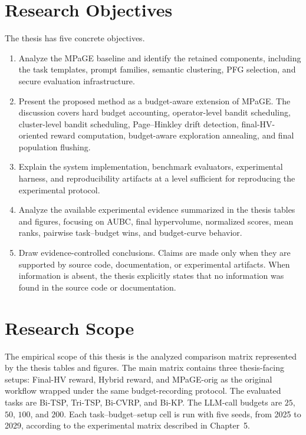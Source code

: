 \documentclass[../main.tex]{subfiles}
\begin{document}
\section{Research Objectives}

The thesis has five concrete objectives.

\begin{enumerate}
  \item Analyze the MPaGE baseline and identify the retained components, including the task templates, prompt families, semantic clustering, PFG selection, and secure evaluation infrastructure.
  \item Present the proposed \bmab{} method as a budget-aware extension of MPaGE. The discussion covers hard budget accounting, operator-level bandit scheduling, cluster-level bandit scheduling, Page--Hinkley drift detection, final-HV-oriented reward computation, budget-aware exploration annealing, and final population flushing.
  \item Explain the system implementation, benchmark evaluators, experimental harness, and reproducibility artifacts at a level sufficient for reproducing the experimental protocol.
  \item Analyze the available experimental evidence summarized in the thesis tables and figures, focusing on AUBC, final hypervolume, normalized scores, mean ranks, pairwise task--budget wins, and budget-curve behavior.
  \item Draw evidence-controlled conclusions. Claims are made only when they are supported by source code, documentation, or experimental artifacts. When information is absent, the thesis explicitly states that no information was found in the source code or documentation.
\end{enumerate}

\section{Research Scope}

The empirical scope of this thesis is the analyzed comparison matrix represented by the thesis tables and figures. The main matrix contains three thesis-facing setups: Final-HV reward, Hybrid reward, and MPaGE-orig as the original workflow wrapped under the same budget-recording protocol. The evaluated tasks are Bi-TSP, Tri-TSP, Bi-CVRP, and Bi-KP. The LLM-call budgets are $25$, $50$, $100$, and $200$. Each task--budget--setup cell is run with five seeds, from 2025 to 2029, according to the experimental matrix described in Chapter~5.
\end{document}
